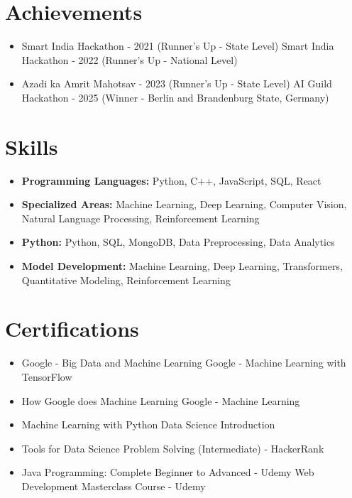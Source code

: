 \documentclass[a4paper,10pt]{article}
\begin{document}
\section*{Achievements}
\begin{itemize}
\item Smart India Hackathon - 2021 (Runner's Up - State Level) \hfill Smart India Hackathon - 2022 (Runner's Up - National Level)
\item Azadi ka Amrit Mahotsav - 2023 (Runner's Up - State Level) \hfill AI Guild Hackathon - 2025 (Winner - Berlin and Brandenburg State, Germany)
\end{itemize}

\section*{Skills}
\begin{itemize}
  \item \textbf{Programming Languages:} Python, C++, JavaScript, SQL, React
  \item \textbf{Specialized Areas:} Machine Learning, Deep Learning, Computer Vision, Natural Language Processing, Reinforcement Learning
  \item \textbf{Python:} Python, SQL, MongoDB, Data Preprocessing, Data Analytics
  \item \textbf{Model Development:} Machine Learning, Deep Learning, Transformers, Quantitative Modeling, Reinforcement Learning
\end{itemize}

\section*{Certifications}
\begin{itemize}
\item Google - Big Data and Machine Learning \hfill Google - Machine Learning with TensorFlow
\item How Google does Machine Learning \hfill Google - Machine Learning
\item Machine Learning with Python \hfill Data Science Introduction
\item Tools for Data Science \hfill Problem Solving (Intermediate) - HackerRank
\item Java Programming: Complete Beginner to Advanced - Udemy \hfill Web Development Masterclass Course - Udemy
\end{itemize}
\end{document}
